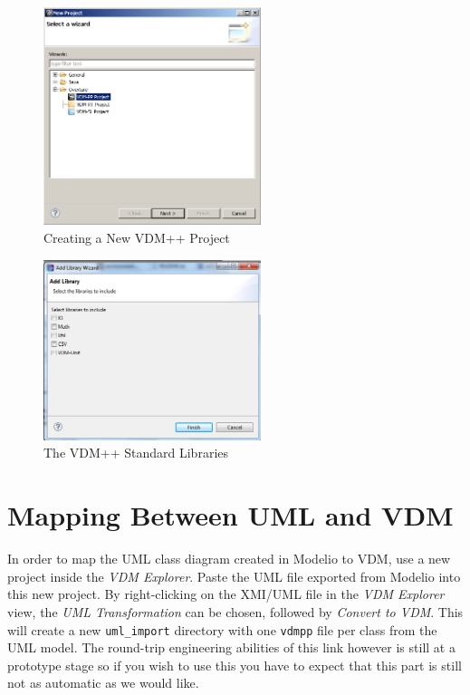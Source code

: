 \begin{figure}[!htb]
\begin{center}
  \includegraphics[width=2.5in]{figures/newoverturePPproject}
  \caption[labelInTOC]{Creating a New VDM++ Project}
  \label{fig:newoverturePPproject}
\end{center}
\end{figure}

\begin{figure}[!htb]
\begin{center}
  \includegraphics[width=2.5in]{figures/stdlibs}
  \caption[labelInTOC]{The VDM++ Standard Libraries}
  \label{fig:stdlibs}
\end{center}
\end{figure}

\section{Mapping Between UML and  VDM}\label{sec:fromUMLtoVDM}\label{sec:syntaxcheck}
\label{sec:typecheck}

In order to map the UML class diagram created in Modelio
to VDM, use a new project inside the \emph{VDM Explorer}. Paste the UML
file exported from Modelio into this new project.
By right-clicking on the XMI/UML file
in the \emph{VDM Explorer} view, the \emph{UML Transformation} can be
chosen, followed by \emph{Convert to VDM}. This will create a new
\texttt{uml\_import} directory with one \texttt{vdmpp} file per class
from the UML model.
The round-trip engineering abilities of
this link however is still at a prototype stage so if you wish to use
this you have to expect that this part is still not as automatic as we
would like.

